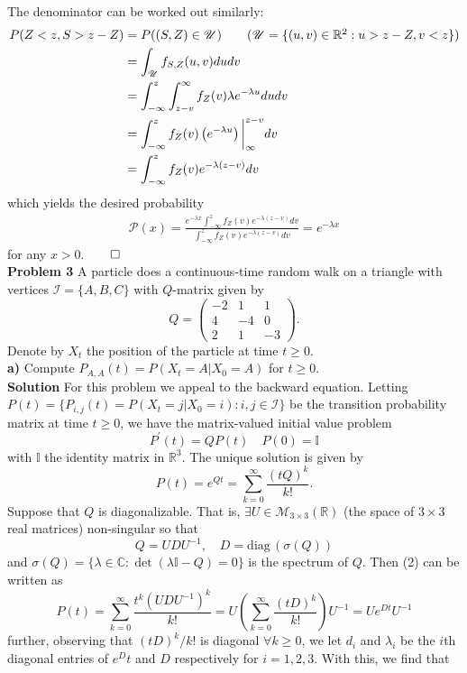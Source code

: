 \documentclass[11pt, letterpaper]{article}
\newcommand{\mbb}[1]{\mathbb{#1}}
\newcommand{\mc}[1]{\mathcal{#1}}
\begin{document}
    The denominator can be worked out similarly:
    \begin{align*}
        P(Z<z,S>z-Z)&=P((S,Z)\in\mc{U})\tag{$\mc{U}=\{(u,v)\in\mbb{R}^2:u>z-Z,v<z\}$}\\
        &=\int_{\mc{U}}f_{S,Z}(u,v)dudv\\
        &=\int_{-\infty}^z\int_{z-v}^\infty f_Z(v)\lambda e^{-\lambda u}dudv\\
        &=\int_{-\infty}^zf_Z(v)\left(e^{-\lambda u}\right)\bigg|_{\infty}^{z-v}dv\\
        &=\int_{-\infty}^zf_Z(v)e^{-\lambda(z-v)}dv
    \end{align*}
    which yields the desired probability
    \begin{align*}
        \mc{P}(x)=\frac{e^{-\lambda x}\int_{-\infty}^zf_Z(v)e^{-\lambda(z-v)}dv}{\int_{-\infty}^zf_Z(v)e^{-\lambda(z-v)}dv}=e^{-\lambda x}
    \end{align*}
    for any $x>0$.\hfill{$\qed$}\\[10pt]
    {\bf Problem 3} A particle does a continuous-time random walk on a triangle with vertices $\mc{I}=\{A,B,C\}$ with $Q$-matrix given by
    \[Q=\begin{pmatrix}
        -2 & 1 & 1\\
        4 & -4 & 0\\
        2 & 1 & -3
    \end{pmatrix}.\]
    Denote by $X_t$ the position of the particle at time $t\geq 0$.\\[10pt]
    {\bf a)} Compute $P_{A,A}(t)=P(X_t=A|X_0=A)$ for $t\geq 0$.\\[10pt]
    {\bf Solution} For this problem we appeal to the backward equation. Letting $P(t)=\{P_{i,j}(t)=P(X_t=j|X_0=i):i,j\in\mc{I}\}$ be the transition probability matrix at time $t\geq 0$, we have the matrix-valued initial value problem 
    \[P^\prime(t)=QP(t)\quad P(0)=\mbb{I}\]
    with $\mbb{I}$ the identity matrix in $\mbb{R}^3$. The unique solution is given by
    \[P(t)=e^{Qt}=\sum_{k=0}^\infty\frac{(tQ)^k}{k!}.\tag{2}\]
    Suppose that $Q$ is diagonalizable. That is, $\exists U\in \mc{M}_{3\times 3}(\mbb{R})$ (the space of $3\times 3$ real matrices) non-singular so that
    \[Q=UDU^{-1},\quad D=\text{diag}\,(\sigma(Q))\]
    and $\sigma(Q)=\{\lambda\in\mbb{C}:\det(\lambda\mbb{I}-Q)=0\}$ is the spectrum of $Q$. Then (2) can be written as
    \[P(t)=\sum_{k=0}^\infty\frac{t^k(UDU^{-1})^k}{k!}=U\left(\sum_{k=0}^\infty\frac{(tD)^k}{k!}\right)U^{-1}=Ue^{Dt}U^{-1}\]
    further, observing that $(tD)^k/k!$ is diagonal $\forall k\geq 0$, we let $d_i$ and $\lambda_i$ be the $i$th diagonal entries of $e^Dt$ and $D$ respectively for $i=1,2,3$. With this, we find that 
\end{document}
